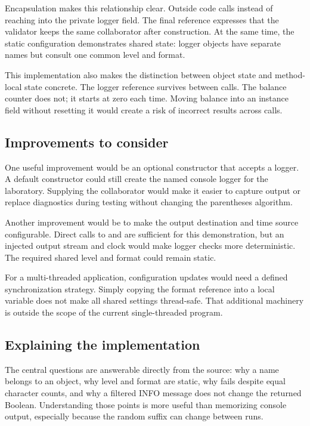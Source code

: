 Encapsulation makes this relationship clear. Outside code calls  instead of reaching into the private logger field. The final reference expresses that the validator keeps the same collaborator after construction. At the same time, the static configuration demonstrates shared state: logger objects have separate names but consult one common level and format.

This implementation also makes the distinction between object state and method-local state concrete. The logger reference survives between calls. The balance counter does not; it starts at zero each time. Moving balance into an instance field without resetting it would create a risk of incorrect results across calls.

\subsection{Improvements to consider}
One useful improvement would be an optional constructor that accepts a logger. A default constructor could still create the named console logger for the laboratory. Supplying the collaborator would make it easier to capture output or replace diagnostics during testing without changing the parentheses algorithm.

Another improvement would be to make the output destination and time source configurable. Direct calls to  and  are sufficient for this demonstration, but an injected output stream and clock would make logger checks more deterministic. The required shared level and format could remain static.

For a multi-threaded application, configuration updates would need a defined synchronization strategy. Simply copying the format reference into a local variable does not make all shared settings thread-safe. That additional machinery is outside the scope of the current single-threaded program.

\subsection{Explaining the implementation}
The central questions are answerable directly from the source: why a name belongs to an object, why level and format are static, why \code{)(} fails despite equal character counts, and why a filtered INFO message does not change the returned Boolean. Understanding those points is more useful than memorizing console output, especially because the random suffix can change between runs.

